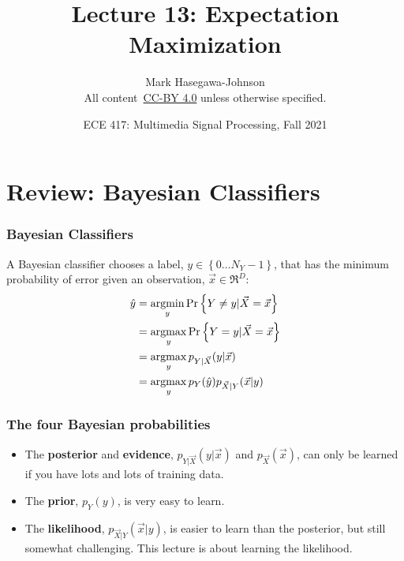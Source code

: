 \documentclass{beamer}
\title{Lecture 13: Expectation Maximization}
\author{Mark Hasegawa-Johnson\\All content~\href{https://creativecommons.org/licenses/by/4.0/}{CC-BY 4.0} unless otherwise specified.}
\date{ECE 417: Multimedia Signal Processing, Fall 2021}
\newcommand{\argmax}{\operatornamewithlimits{argmax}}
\newcommand{\argmin}{\operatornamewithlimits{argmin}}
\begin{document}
\begin{frame}
  \maketitle
\end{frame}

\begin{frame}
  \tableofcontents
\end{frame}

\section[Bayesian]{Review: Bayesian Classifiers}
\setcounter{subsection}{1}

\begin{frame}
  \frametitle{Bayesian Classifiers}
  
  A Bayesian classifier chooses a label, $y\in\left\{0\ldots N_Y-1\right\}$, that has
    the minimum probability of error given an observation,
    $\vec{x}\in\Re^D$:
  \begin{align*}
    \hat{y} &= \argmin_{y} \Pr\left\{Y \ne y|\vec{X}=\vec{x}\right\}\\
    &= \argmax_{y} \Pr\left\{Y = y|\vec{X}=\vec{x}\right\}\\
    &= \argmax_{y} p_{Y|\vec{X}}(y|\vec{x})\\
    &= \argmax_{y} p_Y(\hat{y}) p_{\vec{X}|Y}(\vec{x}|y)
  \end{align*}
\end{frame}

\begin{frame}
  \frametitle{The four Bayesian probabilities}

  \begin{itemize}
  \item The {\bf posterior} and {\bf evidence},
    $p_{Y|\vec{X}}(y|\vec{x})$ and $p_{\vec{X}}(\vec{x})$, can only be learned
    if you have lots and lots of training  data.
  \item The {\bf prior}, $p_Y(y)$, is very easy to learn.
  \item The {\bf likelihood}, $p_{\vec{X}|Y}(\vec{x}|y)$, is
    easier to learn than the posterior, but still somewhat challenging.
    This lecture is about learning the likelihood.
  \end{itemize}
\end{frame}

\end{document}
